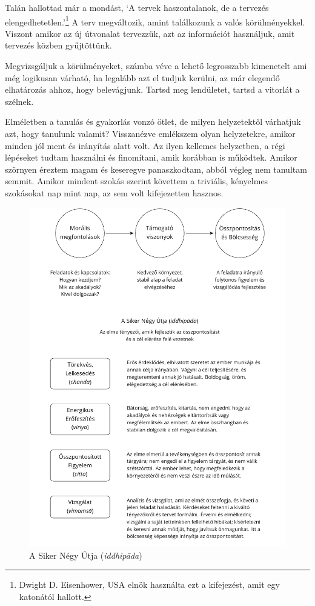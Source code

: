 
Talán hallottad már a mondást, `A tervek haszontalanok, de a tervezés
elengedhetetlen.'\footnote{Dwight D. Eisenhower, USA elnök használta ezt
  a kifejezést, amit egy katonától hallott.} A terv megváltozik, amint
találkozunk a valós körülményekkel. Viszont amikor az új útvonalat
tervezzük, azt az információt használjuk, amit tervezés közben
gyűjtöttünk.

Megvizsgáljuk a körülményeket, számba véve a lehető legrosszabb
kimenetelt ami még logikusan várható, ha legalább azt el tudjuk kerülni,
az már elegendő elhatározás ahhoz, hogy belevágjunk. Tartsd meg
lendületet, tartsd a vitorlát a szélnek.

Elméletben a tanulás és gyakorlás vonzó ötlet, de milyen helyzetektől
várhatjuk azt, hogy tanulunk valamit? Visszanézve emlékszem olyan
helyzetekre, amikor minden jól ment és irányítás alatt volt. Az ilyen
kellemes helyzetben, a régi lépéseket tudtam használni és finomítani,
amik korábban is működtek. Amikor szörnyen éreztem magam és keseregve
panaszkodtam, abból végleg nem tanultam semmit. Amikor mindent szokás
szerint követtem a triviális, kényelmes szokásokat nap mint nap, az sem
volt kifejezetten hasznos.

\clearpage
\figurepagelayout

\begin{figure}[h]
\caption{A Siker Négy Útja (\emph{iddhipāda})}\label{fig-success}
\bigskip
\includegraphics[width=0.95\linewidth]{./manuscript/tex/diagrams/paths-to-success-hu.pdf}
\end{figure}


